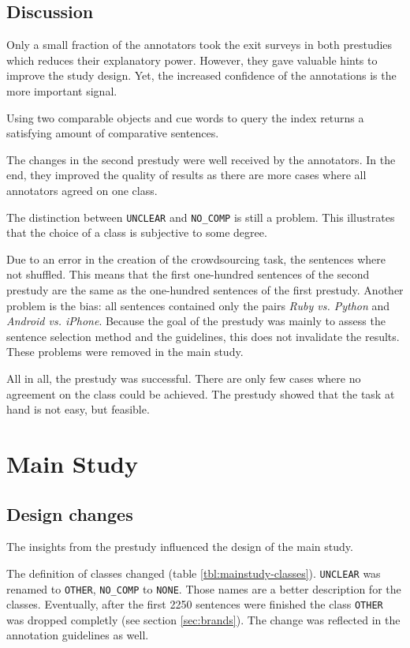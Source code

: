 \subsection{Discussion}
Only a small fraction of the annotators took the exit surveys in both prestudies which reduces their explanatory power. However, they gave valuable hints to improve the study design. Yet, the increased confidence of the annotations is the more important signal.

Using two comparable objects and cue words to query the index returns a satisfying amount of comparative sentences.

The changes in the second prestudy were well received by the annotators. In the end, they improved the quality of results as there are more cases where all annotators agreed on one class.


The distinction between \texttt{UNCLEAR} and \texttt{NO\_COMP} is still a problem. This illustrates that the choice of a class is subjective to some degree. 

Due to an error in the creation of the crowdsourcing task, the sentences where not shuffled. This means that the first one-hundred sentences of the second prestudy are the same as the one-hundred sentences of the first prestudy. Another problem is the bias: all sentences contained only the pairs \emph{Ruby vs. Python} and \emph{Android vs. iPhone}. Because the goal of the prestudy was mainly to assess the sentence selection method and the guidelines, this does not invalidate the results. These problems were removed in the main study.
\hfill\newline

All in all, the prestudy was successful. There are only few cases where no agreement on the class could be achieved. The prestudy showed that the task at hand is not easy, but feasible.

\newpage
\section{Main Study}
\label{sec:mainstudy}
\subsection{Design changes}
\label{sec:designchanges}
The insights from the prestudy influenced the design of the main study.

The definition of classes changed (table \ref{tbl:mainstudy-classes}). \texttt{UNCLEAR} was renamed to \texttt{OTHER}, \texttt{NO\_COMP} to \texttt{NONE}. Those names are a better description for the classes. Eventually, after the first 2250 sentences were finished the class \texttt{OTHER} was dropped completly (see section \ref{sec:brands}). The change was reflected in the annotation guidelines as well. 

